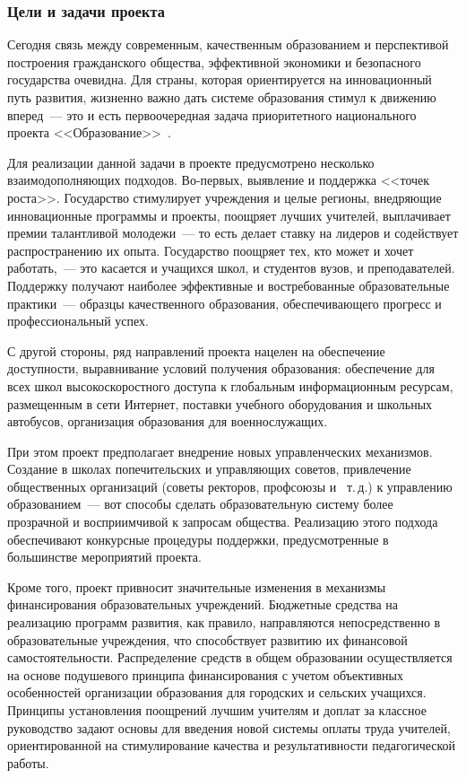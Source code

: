 \documentclass[article, 12pt, russian, oneside]{ncc}
\begin{document}
\subsubsection{Цели и задачи проекта}

Сегодня связь между современным, качественным образованием и
перспективой построения гражданского общества, эффективной экономики и
безопасного государства очевидна. Для страны, которая ориентируется на
инновационный путь развития, жизненно важно дать системе образования
стимул к движению вперед~--- это и есть первоочередная задача
приоритетного национального проекта
<<Образование>>~\cite{Edu_Problems}.

Для реализации данной задачи в проекте предусмотрено несколько
взаимодополняющих подходов. Во-первых, выявление и поддержка <<точек
роста>>. Государство стимулирует учреждения и целые регионы,
внедряющие инновационные программы и проекты, поощряет лучших
учителей, выплачивает премии талантливой молодежи~--- то есть делает
ставку на лидеров и содействует распространению их опыта. Государство
поощряет тех, кто может и хочет работать,~--- это касается и учащихся
школ, и студентов вузов, и преподавателей. Поддержку получают наиболее
эффективные и востребованные образовательные практики~--- образцы
качественного образования, обеспечивающего прогресс и профессиональный
успех.

С другой стороны, ряд направлений проекта нацелен на обеспечение
доступности, выравнивание условий получения образования: обеспечение
для всех школ высокоскоростного доступа к глобальным информационным
ресурсам, размещенным в сети Интернет, поставки учебного оборудования
и школьных автобусов, организация образования для военнослужащих.

При этом проект предполагает внедрение новых управленческих
механизмов. Создание в школах попечительских и управляющих советов,
привлечение общественных организаций (советы ректоров, профсоюзы и~
т.\,д.) к управлению образованием~--- вот способы сделать
образовательную систему более прозрачной и восприимчивой к запросам
общества. Реализацию этого подхода обеспечивают конкурсные процедуры
поддержки, предусмотренные в большинстве мероприятий проекта.

Кроме того, проект привносит значительные изменения в механизмы
финансирования образовательных учреждений. Бюджетные средства на
реализацию программ развития, как правило, направляются
непосредственно в образовательные учреждения, что способствует
развитию их финансовой самостоятельности. Распределение средств в
общем образовании осуществляется на основе подушевого принципа
финансирования с учетом объективных особенностей организации
образования для городских и сельских учащихся. Принципы установления
поощрений лучшим учителям и доплат за классное руководство задают
основы для введения новой системы оплаты труда учителей,
ориентированной на стимулирование качества и результативности
педагогической работы.
\end{document}
